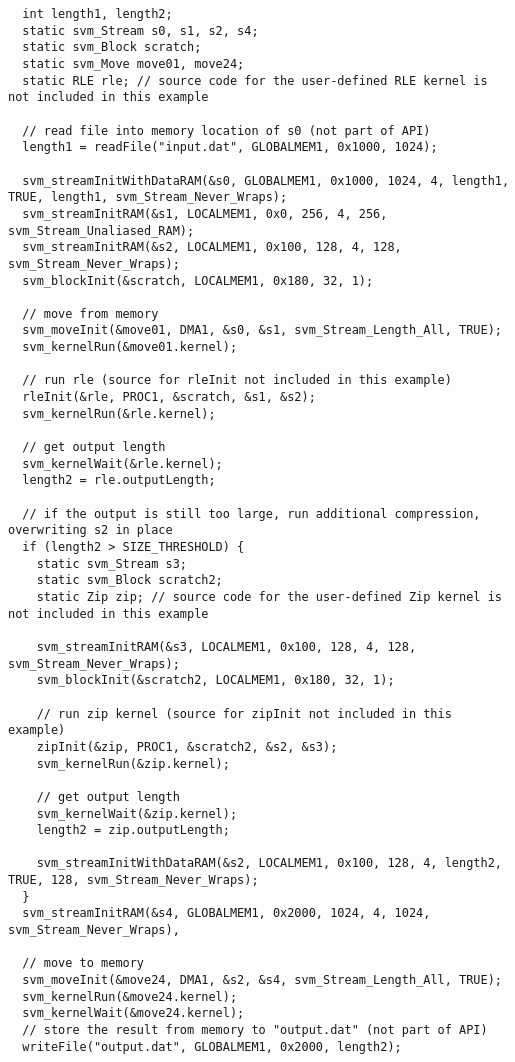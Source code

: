 {\small
\begin{verbatim}
  int length1, length2;
  static svm_Stream s0, s1, s2, s4;
  static svm_Block scratch;
  static svm_Move move01, move24;
  static RLE rle; // source code for the user-defined RLE kernel is not included in this example

  // read file into memory location of s0 (not part of API)
  length1 = readFile("input.dat", GLOBALMEM1, 0x1000, 1024);

  svm_streamInitWithDataRAM(&s0, GLOBALMEM1, 0x1000, 1024, 4, length1, TRUE, length1, svm_Stream_Never_Wraps);
  svm_streamInitRAM(&s1, LOCALMEM1, 0x0, 256, 4, 256, svm_Stream_Unaliased_RAM);
  svm_streamInitRAM(&s2, LOCALMEM1, 0x100, 128, 4, 128, svm_Stream_Never_Wraps);
  svm_blockInit(&scratch, LOCALMEM1, 0x180, 32, 1);

  // move from memory
  svm_moveInit(&move01, DMA1, &s0, &s1, svm_Stream_Length_All, TRUE);
  svm_kernelRun(&move01.kernel);
  
  // run rle (source for rleInit not included in this example)
  rleInit(&rle, PROC1, &scratch, &s1, &s2);
  svm_kernelRun(&rle.kernel);

  // get output length
  svm_kernelWait(&rle.kernel);
  length2 = rle.outputLength;
  
  // if the output is still too large, run additional compression, overwriting s2 in place
  if (length2 > SIZE_THRESHOLD) {
    static svm_Stream s3;
    static svm_Block scratch2;
    static Zip zip; // source code for the user-defined Zip kernel is not included in this example

    svm_streamInitRAM(&s3, LOCALMEM1, 0x100, 128, 4, 128, svm_Stream_Never_Wraps);
    svm_blockInit(&scratch2, LOCALMEM1, 0x180, 32, 1);

    // run zip kernel (source for zipInit not included in this example)
    zipInit(&zip, PROC1, &scratch2, &s2, &s3);
    svm_kernelRun(&zip.kernel);
    
    // get output length
    svm_kernelWait(&zip.kernel);
    length2 = zip.outputLength;

    svm_streamInitWithDataRAM(&s2, LOCALMEM1, 0x100, 128, 4, length2, TRUE, 128, svm_Stream_Never_Wraps);
  }
  svm_streamInitRAM(&s4, GLOBALMEM1, 0x2000, 1024, 4, 1024, svm_Stream_Never_Wraps),
  
  // move to memory
  svm_moveInit(&move24, DMA1, &s2, &s4, svm_Stream_Length_All, TRUE);
  svm_kernelRun(&move24.kernel);
  svm_kernelWait(&move24.kernel);
  // store the result from memory to "output.dat" (not part of API)
  writeFile("output.dat", GLOBALMEM1, 0x2000, length2); 
\end{verbatim}}

